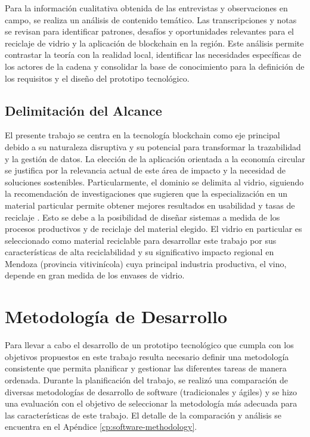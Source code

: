Para la información cualitativa obtenida de las entrevistas y observaciones en campo, se realiza un análisis de contenido temático. Las transcripciones y notas se revisan para identificar patrones, desafíos y oportunidades relevantes para el reciclaje de vidrio y la aplicación de blockchain en la región. Este análisis permite contrastar la teoría con la realidad local, identificar las necesidades específicas de los actores de la cadena y consolidar la base de conocimiento para la definición de los requisitos y el diseño del prototipo tecnológico.

\subsection{Delimitación del Alcance}

El presente trabajo se centra en la tecnología blockchain como eje principal debido a su naturaleza disruptiva y su potencial para transformar la trazabilidad y la gestión de datos. La elección de la aplicación orientada a la economía circular se justifica por la relevancia actual de este área de impacto y la necesidad de soluciones sostenibles. Particularmente, el dominio se delimita al vidrio, siguiendo la recomendación de investigaciones que sugieren que la especialización en un material particular permite obtener mejores resultados en usabilidad y tasas de reciclaje \cite{pending}. Esto se debe a la posibilidad de diseñar sistemas a medida de los procesos productivos y de reciclaje del material elegido. El vidrio en particular es seleccionado como material reciclable para desarrollar este trabajo por sus características de alta reciclabilidad y su significativo impacto regional en Mendoza (provincia vitivinícola) cuya principal industria productiva, el vino, depende en gran medida de los envases de vidrio. %

\section{Metodología de Desarrollo}
\label{sec:software-method}

Para llevar a cabo el desarrollo de un prototipo tecnológico que cumpla con los objetivos propuestos en este trabajo resulta necesario definir una metodología consistente que permita planificar y gestionar las diferentes tareas de manera ordenada. Durante la planificación del trabajo, se realizó una comparación de diversas metodologías de desarrollo de software (tradicionales y ágiles) y se hizo una evaluación con el objetivo de seleccionar la metodología más adecuada para las características de este trabajo. El detalle de la comparación y análisis se encuentra en el Apéndice \ref{cp:software-methodology}. 

